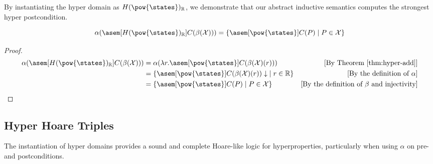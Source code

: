 By instantiating the hyper domain as $H(\pow{\states})_{\mathbb{R}}$, we
demonstrate that our abstract inductive semantics computes the strongest hyper
postcondition.

\begin{theorem}
  \label{thm:hyperpost} 
  $$\alpha(\asem[H(\pow{\states})_\mathbb{R}]{C}(\beta(\mathcal{X}))) = \{ \asem[\pow{\states}]{C}(P) \mid P \in \mathcal{X} \}$$
\end{theorem}
\begin{proof}
  \begin{align*}
    \alpha(\asem[H(\pow{\states})_\mathbb{R}]{C}(\beta(\mathcal{X})))
      &= \alpha(\lambda r . \asem[\pow{\states}]{C}(\beta(\mathcal{X})(r)))
      &\text{[By Theorem \ref{thm:hyper-add}]} \\
      &= \{ \asem[\pow{\states}]{C}(\beta(\mathcal{X})(r))\downarrow \;
        \mid r \in \mathbb{R} \}
      &\text{[By the definition of $\alpha$]}\\
      &= \{ \asem[\pow{\states}]{C}(P) \mid P \in \mathcal{X} \}
      &\text{[By the definition of $\beta$ and injectivity]}\\
  \end{align*}
\end{proof}

\subsection{Hyper Hoare Triples}

The instantiation of hyper domains provides a sound and complete Hoare-like
logic for hyperproperties, particularly when using $\alpha$ on pre- and
postconditions.

